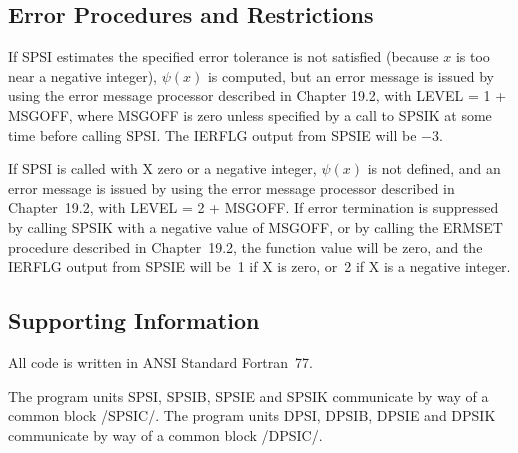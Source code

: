\documentclass[twoside]{MATH77}
\begin{document}



\subsection{Error Procedures and Restrictions}

If SPSI estimates the specified error tolerance is not satisfied (because $x$
is too near a negative integer), $\psi (x)$ is computed, but an error
message is issued by using the error message processor described in Chapter
19.2, with LEVEL = 1 + MSGOFF, where MSGOFF is zero unless specified by a
call to SPSIK at some time before calling SPSI. The IERFLG output from SPSIE
will be $-$3.

If SPSI is called with X zero or a negative integer, $\psi (x)$ is not
defined, and an error message is issued by using the error message processor
described in Chapter~19.2, with LEVEL = 2 + MSGOFF. If error termination is
suppressed by calling SPSIK with a negative value of MSGOFF, or by calling
the ERMSET procedure described in Chapter~19.2, the function value will be
zero, and the IERFLG output from SPSIE will be~1 if X is zero, or~2 if X is
a negative integer.

\subsection{Supporting Information}

All code is written in ANSI Standard Fortran~77.

The program units SPSI, SPSIB, SPSIE and SPSIK communicate by way of a
common block /SPSIC/. The program units DPSI, DPSIB, DPSIE and DPSIK
communicate by way of a common block /DPSIC/.
\end{document}
